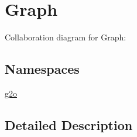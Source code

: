 \hypertarget{group__graph}{}\section{Graph}
\label{group__graph}
Collaboration diagram for Graph\+:
\subsection*{Namespaces}
\begin{DoxyCompactItemize}
\item 
 \hyperlink{namespaceg2o}{g2o}
\end{DoxyCompactItemize}


\subsection{Detailed Description}
